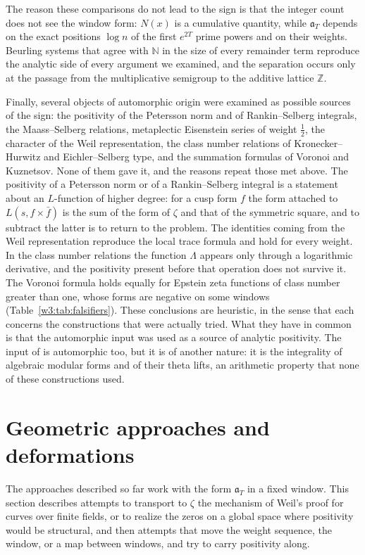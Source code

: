 \documentclass[11pt]{amsart}
\theoremstyle{definition}
\theoremstyle{remark}
\numberwithin{equation}{section}
\newcommand{\N}{\mathbb{N}}
\newcommand{\Z}{\mathbb{Z}}
\newcommand{\aT}{\mathfrak{a}_T}                       %
\begin{document}
The reason these comparisons do not lead to the sign is that the integer count does not see the window form:
$N(x)$ is a cumulative quantity, while $\aT$ depends on the exact positions $\log n$ of the first $e^{2T}$
prime powers and on their weights. Beurling systems that agree with $\N$ in the size of every remainder term
reproduce the analytic side of every argument we examined, and the separation occurs only at the passage from
the multiplicative semigroup to the additive lattice $\Z$.

Finally, several objects of automorphic origin were examined as possible sources of the sign: the positivity of
the Petersson norm and of Rankin--Selberg integrals, the Maass--Selberg relations, metaplectic Eisenstein series
of weight $\frac12$, the character of the Weil representation, the class number relations of
Kronecker--Hurwitz and Eichler--Selberg type, and the summation formulas of Voronoi and Kuznetsov. None of
them gave it, and the reasons repeat those met above. The positivity of a Petersson norm or of a
Rankin--Selberg integral is a statement about an $L$-function of higher degree: for a cusp form $f$ the form
attached to $L(s,f\times\bar f)$ is the sum of the form of $\zeta$ and that of the symmetric square, and to
subtract the latter is to return to the problem. The identities coming from the Weil representation reproduce
the local trace formula and hold for every weight. In the class number relations the function $\Lambda$ appears
only through a logarithmic derivative, and the positivity present before that operation does not survive it.
The Voronoi formula holds equally for Epstein zeta functions of class number greater than one, whose forms are
negative on some windows (Table~\ref{w3:tab:falsifiers}). These conclusions are heuristic, in the sense that
each concerns the constructions that were actually tried. What they have in common is that the automorphic
input was used as a source of analytic positivity. The input of \cite{P46} is automorphic too, but it is of
another nature: it is the integrality of algebraic modular forms and of their theta lifts, an arithmetic
property that none of these constructions used.

\section{Geometric approaches and deformations}\label{w7:sec:geometry}

The approaches described so far work with the form $\aT$ in a fixed window. This section describes attempts to
transport to $\zeta$ the mechanism of Weil's proof for curves over finite fields, or to realize the zeros on a
global space where positivity would be structural, and then attempts that move the weight sequence, the window,
or a map between windows, and try to carry positivity along.
\end{document}
